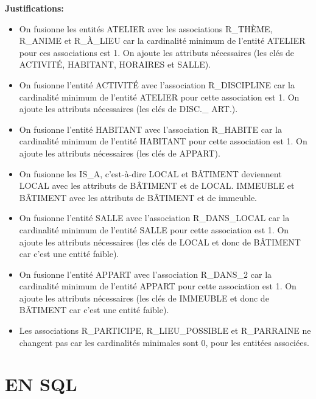 \documentclass[a4paper,10.5pt]{report}
\begin{document}
	\textbf{Justifications: }
	\begin{itemize}
		\item On fusionne les entités ATELIER avec les associations R\_THÈME, R\_ANIME et R\_À\_LIEU car la cardinalité minimum de l'entité ATELIER pour ces associations est 1. On ajoute les attributs nécessaires (les clés de ACTIVITÉ, HABITANT, HORAIRES et SALLE).
		\item	On fusionne l'entité ACTIVITÉ avec l'association R\_DISCIPLINE car la cardinalité minimum de l'entité ATELIER pour cette association est 1. On ajoute les attributs nécessaires (les clés de DISC.\_ ART.).
		\item	On fusionne l'entité HABITANT avec l'association R\_HABITE car la cardinalité minimum de l'entité HABITANT pour cette association est 1. On ajoute les attributs nécessaires (les clés de APPART).
		\item On fusionne les IS\_A, c'est-à-dire LOCAL et BÂTIMENT deviennent LOCAL avec les attributs de BÂTIMENT et de LOCAL\@. IMMEUBLE et BÂTIMENT avec les attributs de BÂTIMENT et de immeuble.
		\item	On fusionne l'entité SALLE avec l'association R\_DANS\_LOCAL car la cardinalité minimum de l'entité SALLE pour cette association est 1. On ajoute les attributs nécessaires (les clés de LOCAL et donc de BÂTIMENT car c'est une entité faible). 
		\item	On fusionne l'entité APPART avec l'association R\_DANS\_2 car la cardinalité minimum de l'entité APPART pour cette association est 1. On ajoute les attributs nécessaires (les clés de IMMEUBLE et donc de BÂTIMENT car c'est une entité faible).
		\item Les associations R\_PARTICIPE, R\_LIEU\_POSSIBLE et R\_PARRAINE ne changent pas car les cardinalités minimales sont 0, pour les entitées associées.

	\end{itemize}
	\newpage
    \section{EN SQL}
\end{document}
